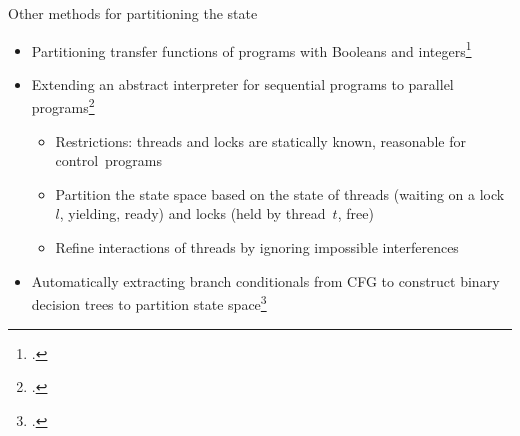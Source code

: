 \documentclass[aspectratio=169]{beamer}
\begin{document}
\begin{frame}{Other methods for partitioning the state}
  \begin{itemize}[<+->]
  \item Partitioning transfer functions of programs with Booleans and integers\footcite{jeannet_representing_2002}
  \item Extending an abstract interpreter for sequential programs to parallel programs\footcite{mine2011static}
    \begin{itemize}
    \item Restrictions: threads and locks are statically known, reasonable for control~programs
    \item Partition the state space based on the state of threads (waiting on a lock~$l$, yielding, ready) and locks (held by thread~$t$, free)
    \item Refine interactions of threads by ignoring impossible interferences
    \end{itemize}
  \item Automatically extracting branch conditionals from CFG to construct binary decision trees to partition state space\footcite{chen2015binary}
  \end{itemize}
\end{frame}
\end{document}
